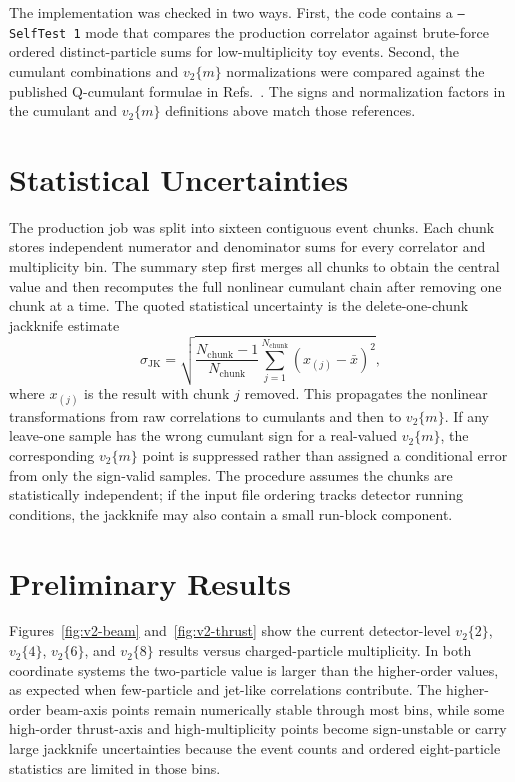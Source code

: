 \documentclass{article}
\newcommand{\vn}[2]{\ensuremath{v_{#1}\{#2\}}}
\begin{document}
The implementation was checked in two ways. First, the code contains a
\texttt{--SelfTest 1} mode that compares the production correlator against
brute-force ordered distinct-particle sums for low-multiplicity toy events.
Second, the cumulant combinations and \(\vn{2}{m}\) normalizations were compared
against the published Q-cumulant formulae in
Refs.~\cite{Bilandzic:2010jr,Bilandzic:2013kga,CMS:2016fnw}. The signs and
normalization factors in the cumulant and \(\vn{2}{m}\) definitions above match
those references.

\section{Statistical Uncertainties}
\label{sec:statistics}

The production job was split into sixteen contiguous event chunks. Each chunk
stores independent numerator and denominator sums for every correlator and
multiplicity bin. The summary step first merges all chunks to obtain the
central value and then recomputes the full nonlinear cumulant chain after
removing one chunk at a time. The quoted statistical uncertainty is the
delete-one-chunk jackknife estimate
\begin{equation}
  \sigma_{\mathrm{JK}} =
  \sqrt{\frac{N_{\mathrm{chunk}}-1}{N_{\mathrm{chunk}}}
  \sum_{j=1}^{N_{\mathrm{chunk}}}
  \left(x_{(j)}-\bar{x}\right)^2},
\end{equation}
where \(x_{(j)}\) is the result with chunk \(j\) removed. This propagates the
nonlinear transformations from raw correlations to cumulants and then to
\(\vn{2}{m}\). If any leave-one sample has the wrong cumulant sign for a
real-valued \(\vn{2}{m}\), the corresponding \(\vn{2}{m}\) point is suppressed
rather than assigned a conditional error from only the sign-valid samples. The
procedure assumes the chunks are statistically independent;
if the input file ordering tracks detector running conditions, the jackknife
may also contain a small run-block component.

\section{Preliminary Results}
\label{sec:results}

Figures~\ref{fig:v2-beam} and~\ref{fig:v2-thrust} show the current
detector-level \(\vn{2}{2}\), \(\vn{2}{4}\), \(\vn{2}{6}\), and \(\vn{2}{8}\)
results versus charged-particle multiplicity. In both coordinate systems the
two-particle value is larger than the higher-order values, as expected when
few-particle and jet-like correlations contribute. The higher-order beam-axis
points remain numerically stable through most bins, while some high-order
thrust-axis and high-multiplicity points become sign-unstable or carry large
jackknife uncertainties because the event counts and ordered eight-particle
statistics are limited in those bins.
\end{document}
